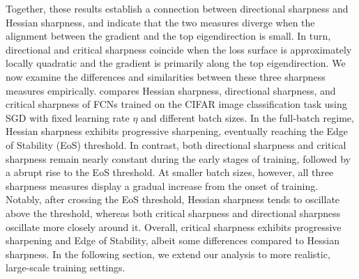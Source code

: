 \documentclass[]{fairmeta}
\theoremstyle{plain}
\theoremstyle{definition}
\begin{document}
Together, these results establish a connection between directional sharpness and Hessian sharpness, and indicate that the two measures diverge when the alignment between the gradient and the top eigendirection is small. In turn, directional and critical sharpness coincide when the loss surface is approximately locally quadratic and the gradient is primarily along the top eigendirection. 
We now examine the differences and similarities between these three sharpness measures empirically.
 compares Hessian sharpness, directional sharpness, and critical sharpness of FCNs trained on the CIFAR image classification task using SGD with fixed learning rate $\eta$ and different batch sizes.
In the full-batch regime, Hessian sharpness exhibits progressive sharpening, eventually reaching the Edge of Stability (EoS) threshold. In contrast, both directional sharpness and critical sharpness remain nearly constant during the early stages of training, followed by a abrupt rise to the EoS threshold.
At smaller batch sizes, however, all three sharpness measures display a gradual increase from the onset of training. Notably, after crossing the EoS threshold, Hessian sharpness tends to oscillate above the threshold, whereas both critical sharpness and directional sharpness oscillate more closely around it.
Overall, critical sharpness exhibits progressive sharpening and Edge of Stability, albeit some differences compared to Hessian sharpness. In the following section, we extend our analysis to more realistic, large-scale training settings.



\end{document}
